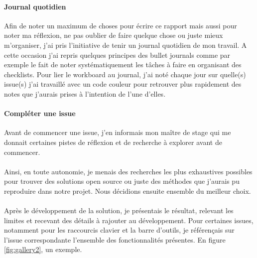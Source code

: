 \documentclass[12pt]{article}
\begin{document}
\paragraph{Journal quotidien}
Afin de noter un maximum de choses pour écrire ce rapport mais aussi pour noter ma réflexion, ne pas oublier de faire quelque chose ou juste mieux m'organiser, j'ai pris l'initiative de tenir un journal quotidien de mon travail. A cette occasion j'ai repris quelques principes des bullet journals comme par exemple le fait de noter systématiquement les tâches à faire en organisant des checklists. Pour lier le workboard au journal, j'ai noté chaque jour sur quelle(s) issue(s) j'ai travaillé avec un code couleur pour retrouver plus rapidement des notes que j'aurais prises à l'intention de l'une d'elles.\\

\paragraph{Compléter une issue}
Avant de commencer une issue, j'en informais mon maître de stage qui me donnait certaines pistes de réflexion et de recherche à explorer avant de commencer.
\paragraph{}
Ainsi, en toute autonomie, je menais des recherches les plus exhaustives possibles pour trouver des solutions open source ou juste des méthodes que j'aurais pu reproduire dans notre projet. Nous décidions ensuite ensemble du meilleur choix.
\paragraph{}
Après le développement de la solution, je présentais le résultat, relevant les limites et recevant des détails à rajouter au développement. Pour certaines issues, notamment pour les raccourcis clavier et la barre d'outils, je référençais sur l'issue correspondante l'ensemble des fonctionnalités présentes. En figure \ref{fig:gallery2}, un exemple.
\end{document}

